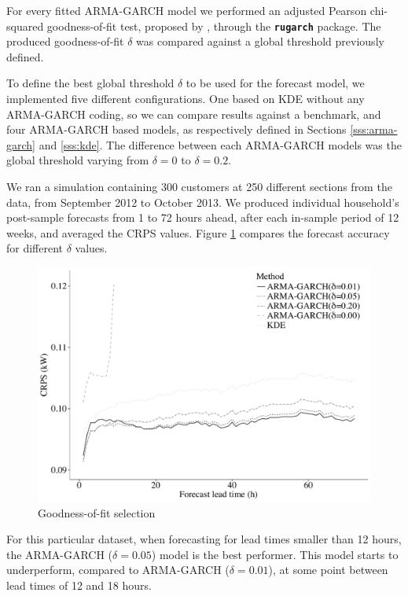 \documentclass[review, 3p, 12pt, authoryear]{elsarticle}
\begin{document}
For every fitted ARMA-GARCH model we performed an adjusted Pearson chi-squared goodness-of-fit test, proposed by \citet{vlaarpalm_gof}, through the \texttt{\textbf{rugarch}} package.
The produced goodness-of-fit $\delta$ was compared against a global threshold previously defined.

To define the best global threshold $\delta$ to be used for the forecast model, we implemented five different configurations.
One based on KDE without any ARMA-GARCH coding, so we can compare results against a benchmark, and four ARMA-GARCH based models, as respectively defined in Sections \ref{sss:arma-garch} and \ref{sss:kde}.
The difference between each ARMA-GARCH models was the global threshold varying from $\delta = 0$ to $\delta = 0.2$.

We ran a simulation containing 300 customers at 250 different sections from the data, from September 2012 to October 2013.
We produced individual household's post-sample forecasts from 1 to 72 hours ahead, after each in-sample period of 12 weeks, and averaged the CRPS values.
Figure \ref{fig:benchmark} compares the forecast accuracy for different $\delta$ values.

\begin{figure}
  \centering
  \includegraphics[scale=0.5]{2017-10-13_big-gofmin_266_graylinesman.pdf}
  \caption{Goodness-of-fit selection}
  \label{fig:benchmark}
\end{figure}

For this particular dataset, when forecasting for lead times smaller than 12 hours, the ARMA-GARCH ($\delta = 0.05$) model is the best performer.
This model starts to underperform, compared to ARMA-GARCH ($\delta = 0.01$), at some point between lead times of 12 and 18 hours.
\end{document}
